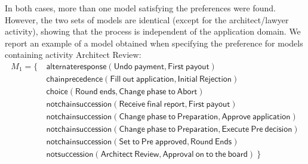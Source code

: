In both cases, more than one model %
satisfying the preferences were found. However, the two sets of models are identical (except for the architect/lawyer activity), showing that the process is independent of the application domain.
We report an example of a model obtained when specifying the preference for models containing activity \textsf{Architect Review}:
%
%
\begin{align*}
M_1 = \{ \ & \mathsf{ alternateresponse(Undo\ payment, First\ payout)} \\
& \mathsf{ chainprecedence(Fill\ out\ application, Initial\ Rejection)} \\
& \mathsf{ choice(Round\ ends, Change\ phase\ to\ Abort)} \\
& \mathsf{ notchainsuccession(Receive\ final\ report, First\ payout)} \\
& \mathsf{ notchainsuccession(Change\ phase\ to\ Preparation, Approve\ application)} \\
& \mathsf{ notchainsuccession(Change\ phase\ to\ Preparation, Execute\ Pre\ decision)} \\
& \mathsf{ notchainsuccession(Set\ to\ Pre\ approved, Round\ Ends)} \\
& \mathsf{ notsuccession(Architect\ Review, Approval\ on\ to\ the\ board)} \ \} 
\end{align*}


